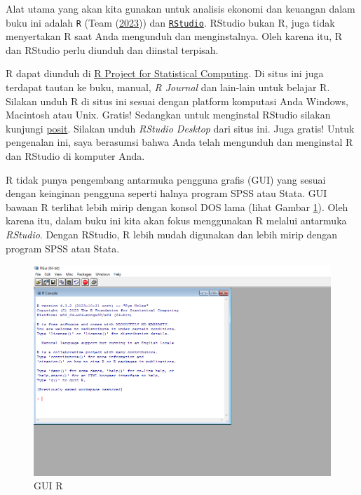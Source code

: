 \documentclass[a4paper, nobind]{templates/ociamthesis}
\begin{document}
\minitoc 

Alat utama yang akan kita gunakan untuk analisis ekonomi dan keuangan dalam buku ini adalah \texttt{R} (Team (\protect\hyperlink{ref-rcoreteamLanguageEnvironmentStatistical2023}{2023})) dan \href{https://posit.co/download/rstudio-desktop/}{\texttt{RStudio}}. RStudio bukan R, juga tidak menyertakan R saat Anda mengunduh dan menginstalnya. Oleh karena itu, R dan RStudio perlu diunduh dan diinstal terpisah.

R dapat diunduh di \href{http://www.r-project.org/}{R Project for Statistical Computing}. Di situs ini juga terdapat tautan ke buku, manual, \emph{R Journal} dan lain-lain untuk belajar R. Silakan unduh R di situs ini sesuai dengan platform komputasi Anda Windows, Macintosh atau Unix. Gratis! Sedangkan untuk menginstal RStudio silakan kunjungi \href{https://posit.co/download/rstudio-desktop/}{posit}. Silakan unduh \emph{RStudio Desktop} dari situs ini. Juga gratis! Untuk pengenalan ini, saya berasumsi bahwa Anda telah mengunduh dan menginstal R dan RStudio di komputer Anda.

R tidak punya pengembang antarmuka pengguna grafis (GUI) yang sesuai dengan keinginan pengguna seperti halnya program SPSS atau Stata. GUI bawaan R terlihat lebih mirip dengan konsol DOS lama (lihat Gambar \ref{fig:rgui}). Oleh karena itu, dalam buku ini kita akan fokus menggunakan R melalui antarmuka \emph{RStudio}. Dengan RStudio, R lebih mudah digunakan dan lebih mirip dengan program SPSS atau Stata.

\begin{figure}[H]
\includegraphics[width=1\linewidth]{figures/console432} \caption{GUI R}\label{fig:rgui}
\end{figure}
\end{document}
